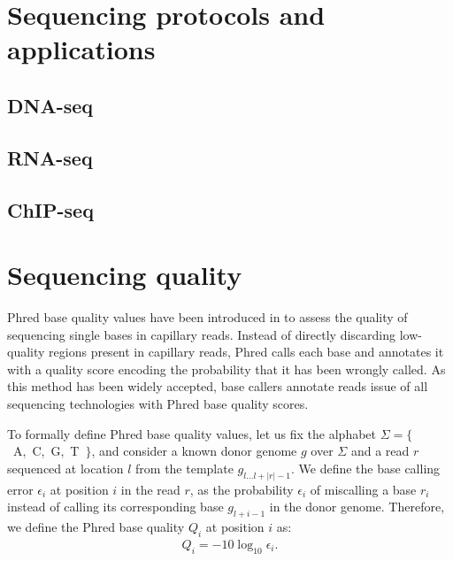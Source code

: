 \section{Sequencing protocols and applications}

\subsection{DNA-seq}
\subsection{RNA-seq}
\subsection{ChIP-seq}

\section{Sequencing quality}


Phred base quality values have been introduced in \citep{Ewing1998, Ewing1998b} to assess the quality of sequencing single bases in capillary reads.
Instead of directly discarding low-quality regions present in capillary reads, Phred calls each base and annotates it with a quality score encoding the probability that it has been wrongly called.
As this method has been widely accepted, base callers annotate reads issue of all sequencing technologies with Phred base quality scores.

To formally define Phred base quality values, let us fix the alphabet $\Sigma = \{$~A,~C,~G,~T~$\}$, and consider a known donor genome $g$ over $\Sigma$ and a read $r$ sequenced at location $l$ from the template $g_{l \dots l+|r|-1}$.
We define the base calling error $\epsilon_i$ at position $i$ in the read $r$, as the probability $\epsilon_i$ of miscalling a base $r_i$ instead of calling its corresponding base $g_{l+i-1}$ in the donor genome.
Therefore, we define the Phred base quality $Q_i$ at position $i$ as:
\begin{eqnarray}
Q_i = -10 \log_{10} \epsilon_i.
\end{eqnarray}

